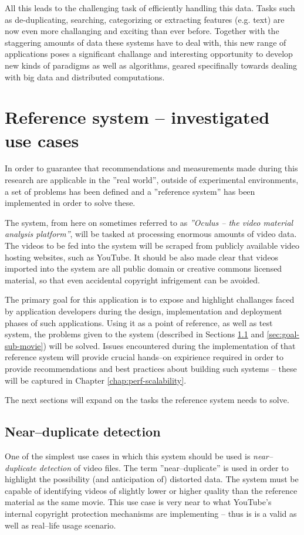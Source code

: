 All this leads to the challenging task of efficiently handling this data. Tasks such as de-duplicating, searching, categorizing or extracting features (e.g. text) are now even more challanging and exciting than ever before. Together with the staggering amounts of data these systems have to deal with, this new range of applications poses a significant challange and interesting opportunity to develop new kinds of paradigms as well as algorithms, geared specifinally towards dealing with big data and distributed computations.


\section{Reference system -- investigated use cases}
\label{sec:ref-system}

In order to guarantee that recommendations and measurements made during this research are applicable in the ''real world'', outside of experimental environments, a set of problems has been defined and a ''reference system'' has been implemented in order to solve these.

The system, from here on sometimes referred to as \textit{''Oculus -- the video material analysis platform''}, will be tasked at processing enormous amounts of video data. The videos to be fed into the system will be scraped from publicly available video hosting websites, such as YouTube. It should be also made clear that videos imported into the system are all public domain or creative commons licensed material, so that even accidental copyright infrigement can be avoided.

The primary goal for this application is to expose and highlight challanges faced by application developers during the design, implementation and deployment phases of such applications. Using it as a point of reference, as well as test system, the problems given to the system (described in Sections \ref{sec:goal-near-dup} and \ref{sec:goal-sub-movie}) will be solved. Issues encountered during the implementation of that reference system will provide crucial hands--on expirience required in order to provide recommendations and best practices about building such systems -- these will be captured in Chapter \ref{chap:perf-scalability}.

The next sections will expand on the tasks the reference system needs to solve.


\subsection{Near--duplicate detection}
\label{sec:goal-near-dup}
One of the simplest use cases in which this system should be used is \textit{near--duplicate detection} of video files. The term ''near--duplicate'' is used in order to highlight the possibility (and anticipation of) distorted data. The system must be capable of identifying videos of slightly lower or higher quality than the reference material as the same movie. This use case is very near to what YouTube's \cite{youtube} internal copyright protection mechanisms are implementing -- thus is is a valid as well as real--life usage scenario.

